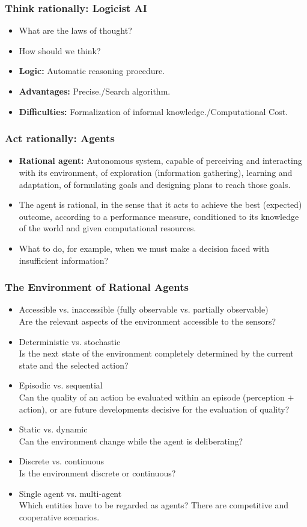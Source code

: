 \documentclass[UTF8,11pt,colorlinks,compress,openany]{beamer}%
\begin{document}
\begin{frame}\frametitle{Think rationally: Logicist AI}
\begin{itemize}
	\item What are the laws of thought?
	\item How should we think?
	\item \textbf{Logic:} Automatic reasoning procedure.
	\item \textbf{Advantages:} Precise./Search algorithm.
	\item \textbf{Difficulties:} Formalization of informal knowledge./Computational Cost.
\end{itemize}
\end{frame}

\begin{frame}\frametitle{Act rationally: Agents}
\begin{itemize}
	\item \textbf{Rational agent:} Autonomous system, capable of perceiving and interacting with its environment, of exploration (information gathering), learning and adaptation, of formulating goals and designing plans to reach those goals.
	\item The agent is rational, in the sense that it acts to achieve the best (expected) outcome, according to a performance measure, conditioned to its knowledge of the world and given computational resources.
	\item What to do, for example, when we must make a decision faced with insufficient information?
\end{itemize}
\end{frame}

\begin{frame}\frametitle{The Environment of Rational Agents}
\begin{itemize}
	\item Accessible vs. inaccessible (fully observable vs. partially observable)\\
Are the relevant aspects of the environment accessible to the sensors?
	\item Deterministic vs. stochastic\\
Is the next state of the environment completely determined by the current state and the selected action?
	\item Episodic vs. sequential\\
Can the quality of an action be evaluated within an episode (perception $+$ action), or are future developments decisive for the evaluation of quality?
	\item Static vs. dynamic\\
Can the environment change while the agent is deliberating?
	\item Discrete vs. continuous\\
Is the environment discrete or continuous?
	\item Single agent vs. multi-agent\\
Which entities have to be regarded as agents? There are competitive and cooperative scenarios.
\end{itemize}
\end{frame}
\end{document}
